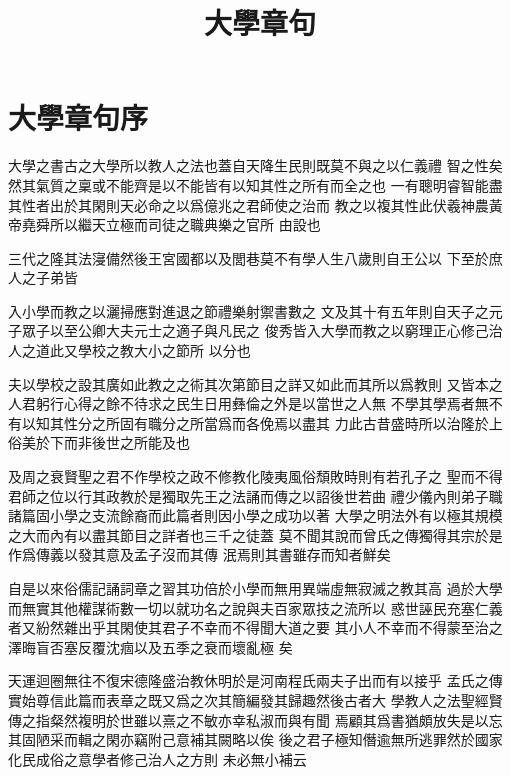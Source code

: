 \documentclass{zhvt-classic}
\title{大學章句}
\begin{document}

\cleardoublepage

\setcounter{page}{1}
\tableofcontents

\mainmatter

\chapter*{大學章句序}

大學之書古之大學所以教人之法也蓋自天降生民則既莫不與之以仁義禮
智之性矣然其氣質之稟或不能齊是以不能皆有以知其性之所有而全之也
一有聰明睿智能盡其性者出於其閑則天必命之以爲億兆之君師使之治而
教之以複其性此伏羲神農黃帝堯舜所以繼天立極而司徒之職典樂之官所
由設也

三代之隆其法寖備然後王宮國都以及閭巷莫不有學人生八歲則自王公以
下至於庶人之子弟皆

入小學而教之以灑掃應對進退之節禮樂射禦書數之
文及其十有五年則自天子之元子眾子以至公卿大夫元士之適子與凡民之
俊秀皆入大學而教之以窮理正心修己治人之道此又學校之教大小之節所
以分也

夫以學校之設其廣如此教之之術其次第節目之詳又如此而其所以爲教則
又皆本之人君躬行心得之餘不待求之民生日用彝倫之外是以當世之人無
不學其學焉者無不有以知其性分之所固有職分之所當爲而各俛焉以盡其
力此古昔盛時所以治隆於上俗美於下而非後世之所能及也

及周之衰賢聖之君不作學校之政不修教化陵夷風俗頹敗時則有若孔子之
聖而不得君師之位以行其政教於是獨取先王之法誦而傳之以詔後世若曲
禮少儀內則弟子職諸篇固小學之支流餘裔而此篇者則因小學之成功以著
大學之明法外有以極其規模之大而內有以盡其節目之詳者也三千之徒蓋
莫不聞其說而曾氏之傳獨得其宗於是作爲傳義以發其意及孟子沒而其傳
泯焉則其書雖存而知者鮮矣

自是以來俗儒記誦詞章之習其功倍於小學而無用異端虛無寂滅之教其高
過於大學而無實其他權謀術數一切以就功名之說與夫百家眾技之流所以
惑世誣民充塞仁義者又紛然雜出乎其閑使其君子不幸而不得聞大道之要
其小人不幸而不得蒙至治之澤晦盲否塞反覆沈痼以及五季之衰而壞亂極
矣

天運迴圈無往不復宋德隆盛治教休明於是河南程氏兩夫子出而有以接乎
孟氏之傳實始尊信此篇而表章之既又爲之次其簡編發其歸趣然後古者大
學教人之法聖經賢傳之指粲然複明於世雖以熹之不敏亦幸私淑而與有聞
焉顧其爲書猶頗放失是以忘其固陋采而輯之閑亦竊附己意補其闕略以俟
後之君子極知僭逾無所逃罪然於國家化民成俗之意學者修己治人之方則
未必無小補云
\end{document}
